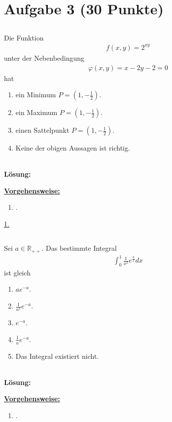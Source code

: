 \section*{Aufgabe 3 (30 Punkte)}
\vspace{0.4cm}
\subsection*{}
Die Funktion
\begin{align*}
	f(x,y) = 2^{xy}
\end{align*}
unter der Nebenbedingung
\begin{align*}
	\varphi(x,y)
	=
	x - 2 y - 2
	= 
	0
\end{align*}
hat
\renewcommand{\labelenumi}{(\alph{enumi})}
\begin{enumerate}
	\item 
	ein Minimum $ P = \left(1,-\frac{1}{2} \right) $.
	\item
	ein Maximum $ P = \left(1,-\frac{1}{2} \right) $.
	\item
	einen Sattelpunkt $ P = \left(1,-\frac{1}{2} \right) $.
	\item 
	Keine der obigen Aussagen ist richtig.
\end{enumerate}
\ \\
\textbf{Lösung:}
\begin{mdframed}
\underline{\textbf{Vorgehensweise:}}
\renewcommand{\labelenumi}{\theenumi.}
\begin{enumerate}
\item .
\end{enumerate}
\end{mdframed}

\underline{1. }\\


 
\newpage

\subsection*{}
Sei $ a \in \mathbb{R}_{++} $. Das bestimmte Integral
\begin{align*}
	\int_0^1
	\frac{1}{x^2} e^{\frac{a}{x}} dx
\end{align*}
ist gleich
\renewcommand{\labelenumi}{(\alph{enumi})}
\begin{enumerate}
	\item 
	$a e^{-a} $.
	\item
	$\frac{1}{a^2} e^{-a}$.
	\item
	$e^{-a} $.
	\item
	$\frac{1}{a} e^{-a}$.	
	\item
	Das Integral existiert nicht.
\end{enumerate}
\ \\
\textbf{Lösung:}
\begin{mdframed}
\underline{\textbf{Vorgehensweise:}}
\renewcommand{\labelenumi}{\theenumi.}
\begin{enumerate}
\item .
\end{enumerate}
\end{mdframed}


